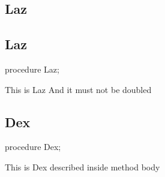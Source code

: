 \documentclass{report}
\newif\ifpdf
\begin{document}
\subsection*{\large{\textbf{Laz}}\normalsize\hspace{1ex}\hrulefill}
\else
\subsection*{Laz}
\fi
\label{ok_parse_impl-Laz}
\begin{list}{}{
\setlength{\itemindent}{0cm}
\setlength{\listparindent}{0cm}
\setlength{\leftmargin}{\evensidemargin}
\addtolength{\leftmargin}{\tmplength}
\settowidth{\labelsep}{X}
\addtolength{\leftmargin}{\labelsep}
\setlength{\labelwidth}{\tmplength}
}
\item[\textbf{Declaration}\hfill]
\ifpdf
\begin{flushleft}
\fi
\begin{ttfamily}
procedure Laz;\end{ttfamily}

\ifpdf
\end{flushleft}
\fi

\par
\item[\textbf{Description}]
This is Laz And it must not be doubled

\end{list}
\ifpdf
\subsection*{\large{\textbf{Dex}}\normalsize\hspace{1ex}\hrulefill}
\else
\subsection*{Dex}
\fi
\label{ok_parse_impl-Dex}
\begin{list}{}{
\setlength{\itemindent}{0cm}
\setlength{\listparindent}{0cm}
\setlength{\leftmargin}{\evensidemargin}
\addtolength{\leftmargin}{\tmplength}
\settowidth{\labelsep}{X}
\addtolength{\leftmargin}{\labelsep}
\setlength{\labelwidth}{\tmplength}
}
\item[\textbf{Declaration}\hfill]
\ifpdf
\begin{flushleft}
\fi
\begin{ttfamily}
procedure Dex;\end{ttfamily}

\ifpdf
\end{flushleft}
\fi

\par
\item[\textbf{Description}]
This is Dex described inside method body

\end{list}
\ifpdf
\end{document}
